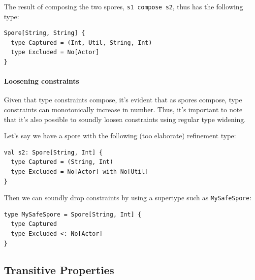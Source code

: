 \documentclass[runningheads]{llncs}
\begin{document}
\begin{sloppypar}

\noindent
The result of composing the two spores, \verb|s1 compose s2|, thus has the following type:

\begin{lstlisting}
Spore[String, String] {
  type Captured = (Int, Util, String, Int)
  type Excluded = No[Actor]
}
\end{lstlisting}

\paragraph{\textbf{Loosening constraints}}

Given that type constraints compose, it's evident that as spores compose, type
constraints can monotonically increase in number. Thus, it's important to note
that it's also possible to soundly loosen constraints using regular type
widening.

Let's say we have a spore with the following (too elaborate) refinement type:


\begin{lstlisting}
val s2: Spore[String, Int] {
  type Captured = (String, Int)
  type Excluded = No[Actor] with No[Util]
}
\end{lstlisting}
\noindent
Then we can soundly drop constraints by using a supertype such as \verb|MySafeSpore|:

\begin{lstlisting}
type MySafeSpore = Spore[String, Int] {
  type Captured
  type Excluded <: No[Actor]
}
\end{lstlisting}



\subsection{Transitive Properties}
\label{sec:trans-props}


\end{sloppypar}
\end{document}
